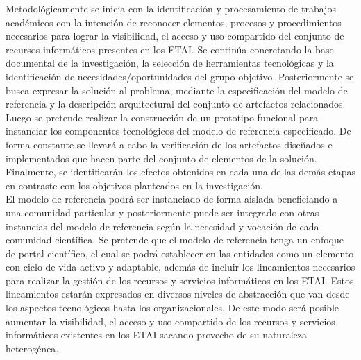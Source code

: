 Metodológicamente se inicia con la identificación y procesamiento de trabajos académicos con la intención de reconocer elementos, procesos y procedimientos necesarios para lograr la visibilidad, el acceso y uso compartido del conjunto de recursos informáticos presentes en los \acrshort{ETAI}. Se continúa concretando la base documental de la investigación, la selección de herramientas tecnológicas y la identificación de necesidades/oportunidades del grupo objetivo. Posteriormente se busca expresar la solución al problema, mediante la especificación del modelo de referencia y la descripción arquitectural del conjunto de artefactos relacionados. Luego se pretende realizar la construcción de un prototipo funcional para instanciar los componentes tecnológicos del modelo de referencia especificado. De forma constante se llevará a cabo la verificación de los artefactos diseñados e implementados que hacen parte del conjunto de elementos de la solución. Finalmente, se identificarán los efectos obtenidos en cada una de las demás etapas en contraste con los objetivos planteados en la investigación.\\

El modelo de referencia podrá ser instanciado de forma aislada beneficiando a una comunidad particular y posteriormente puede ser integrado con otras instancias del modelo de referencia según la necesidad y vocación de cada comunidad científica. Se pretende que el modelo de referencia tenga un enfoque de portal científico, el cual se podrá establecer en las entidades como un elemento con ciclo de vida activo y adaptable, además de incluir los lineamientos necesarios para realizar la gestión de los recursos y servicios informáticos en los \acrshort{ETAI}. Estos lineamientos estarán expresados en diversos niveles de abstracción que van desde los aspectos tecnológicos hasta los organizacionales. De este modo será posible aumentar la visibilidad, el acceso y uso compartido de los recursos y servicios informáticos existentes en los \acrshort{ETAI} sacando provecho de su naturaleza heterogénea.\\


